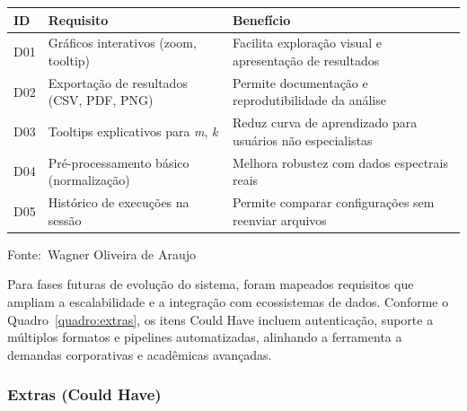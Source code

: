 \documentclass[12pt,a4paper]{article}
\newcommand{\oautor}{Wagner Oliveira de Araujo}
\begin{document}
\begin{quadro}[ht]
\centering
\small
\caption{Requisitos desejáveis do sistema (Should Have)}
\label{quadro:desejaveis}
\begin{threeparttable}
\begin{tabularx}{\textwidth}{|l|X|X|} \hline
\textbf{ID} & \textbf{Requisito} & \textbf{Benefício} \\ \hline
D01 & Gráficos interativos (zoom, tooltip) & Facilita exploração visual e apresentação de resultados \\ \hline
D02 & Exportação de resultados (CSV, PDF, PNG) & Permite documentação e reprodutibilidade da análise \\ \hline
D03 & Tooltips explicativos para \textit{m}, \textit{k} & Reduz curva de aprendizado para usuários não especialistas \\ \hline
D04 & Pré-processamento básico (normalização) & Melhora robustez com dados espectrais reais \\ \hline
D05 & Histórico de execuções na sessão & Permite comparar configurações sem reenviar arquivos \\ \hline
\end{tabularx}
\begin{tablenotes}[flushleft]
\footnotesize
\item Fonte:~\oautor
\end{tablenotes}
\end{threeparttable}
\end{quadro}

Para fases futuras de evolução do sistema, foram mapeados requisitos que ampliam a escalabilidade e a integração com ecossistemas de dados. Conforme o Quadro~\ref{quadro:extras}, os itens Could Have incluem autenticação, suporte a múltiplos formatos e pipelines automatizadas, alinhando a ferramenta a demandas corporativas e acadêmicas avançadas.

\subsubsection{Extras (Could Have)}
\end{document}
